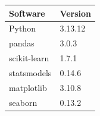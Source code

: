 \begin{tabular}{@{}ll@{}}
\toprule
Software & Version \\
\midrule
Python & 3.13.12 \\
pandas & 3.0.3 \\
scikit-learn & 1.7.1 \\
statsmodels & 0.14.6 \\
matplotlib & 3.10.8 \\
seaborn & 0.13.2 \\
\bottomrule
\end{tabular}
